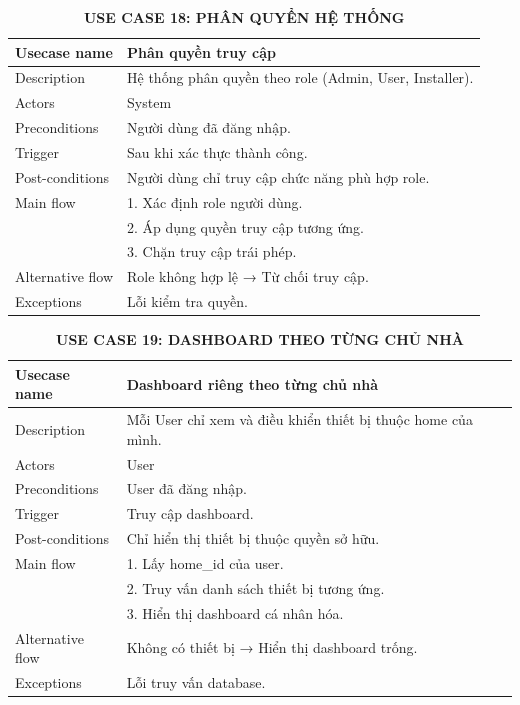 \begin{table}[H]
\centering
\caption*{\textbf{USE CASE 18: PHÂN QUYỀN HỆ THỐNG}}
\renewcommand{\arraystretch}{1.3}
\begin{tabular}{|p{4cm}|p{11cm}|}
\hline
Usecase name & Phân quyền truy cập \\
\hline
Description & Hệ thống phân quyền theo role (Admin, User, Installer). \\
\hline
Actors & System \\
\hline
Preconditions & Người dùng đã đăng nhập. \\
\hline
Trigger & Sau khi xác thực thành công. \\
\hline
Post-conditions & Người dùng chỉ truy cập chức năng phù hợp role. \\
\hline
Main flow &
1. Xác định role người dùng.\\ &
2. Áp dụng quyền truy cập tương ứng.\\ &
3. Chặn truy cập trái phép. \\
\hline
Alternative flow & Role không hợp lệ → Từ chối truy cập. \\
\hline
Exceptions & Lỗi kiểm tra quyền. \\
\hline
\end{tabular}
\end{table}
\begin{table}[H]
\centering
\caption*{\textbf{USE CASE 19: DASHBOARD THEO TỪNG CHỦ NHÀ}}
\renewcommand{\arraystretch}{1.3}
\begin{tabular}{|p{4cm}|p{11cm}|}
\hline
Usecase name & Dashboard riêng theo từng chủ nhà \\
\hline
Description & Mỗi User chỉ xem và điều khiển thiết bị thuộc home của mình. \\
\hline
Actors & User \\
\hline
Preconditions & User đã đăng nhập. \\
\hline
Trigger & Truy cập dashboard. \\
\hline
Post-conditions & Chỉ hiển thị thiết bị thuộc quyền sở hữu. \\
\hline
Main flow &
1. Lấy home\_id của user.\\ &
2. Truy vấn danh sách thiết bị tương ứng.\\ &
3. Hiển thị dashboard cá nhân hóa. \\
\hline
Alternative flow & Không có thiết bị → Hiển thị dashboard trống. \\
\hline
Exceptions & Lỗi truy vấn database. \\
\hline
\end{tabular}
\end{table}


